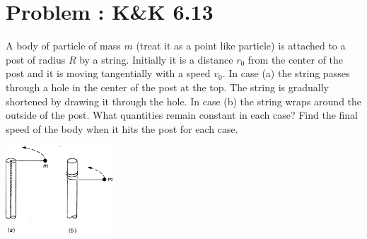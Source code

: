 \documentclass[problems]{esg8012pset}
\begin{document}
\section{Problem \thesection: K\&K 6.13}
  A body of particle of mass $m$ (treat it as a point like particle) is attached to a post of radius $R$ by a string. Initially it is a distance $r_0$ from the center of the post and it is moving tangentially with a speed $v_0$. In case (a) the string passes through a hole in the center of the post at the top. The string is gradually shortened by drawing it through the hole. In case (b) the string wraps around the outside of the post. What quantities remain constant in each case? Find the final speed of the body when it hits the post for each case.
  \begin{center}\includegraphics[width=0.3\textwidth]{ps08_5}\end{center}
\end{document}
